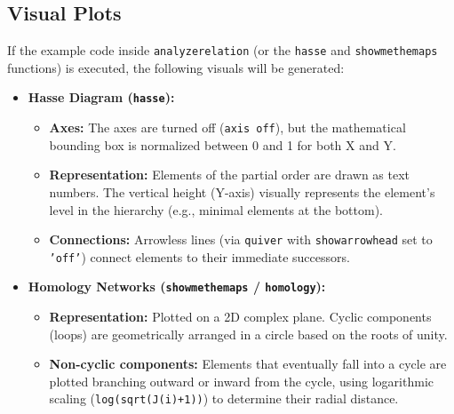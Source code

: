 \subsection*{Visual Plots}


If the example code inside \texttt{analyzerelation} (or the \texttt{hasse} and \texttt{showmethemaps} functions) is executed, the following visuals will be generated:

\begin{itemize}
    \item \textbf{Hasse Diagram (\texttt{hasse}):}
    \begin{itemize}
        \item \textbf{Axes:} The axes are turned off (\texttt{axis off}), but the mathematical bounding box is normalized between 0 and 1 for both X and Y.
        \item \textbf{Representation:} Elements of the partial order are drawn as text numbers. The vertical height (Y-axis) visually represents the element's level in the hierarchy (e.g., minimal elements at the bottom).
        \item \textbf{Connections:} Arrowless lines (via \texttt{quiver} with \texttt{showarrowhead} set to \texttt{'off'}) connect elements to their immediate successors.
    \end{itemize}
    \item \textbf{Homology Networks (\texttt{showmethemaps} / \texttt{homology}):}
    \begin{itemize}
        \item \textbf{Representation:} Plotted on a 2D complex plane. Cyclic components (loops) are geometrically arranged in a circle based on the roots of unity.
        \item \textbf{Non-cyclic components:} Elements that eventually fall into a cycle are plotted branching outward or inward from the cycle, using logarithmic scaling (\texttt{log(sqrt(J(i)+1))}) to determine their radial distance.
    \end{itemize}
\end{itemize}
